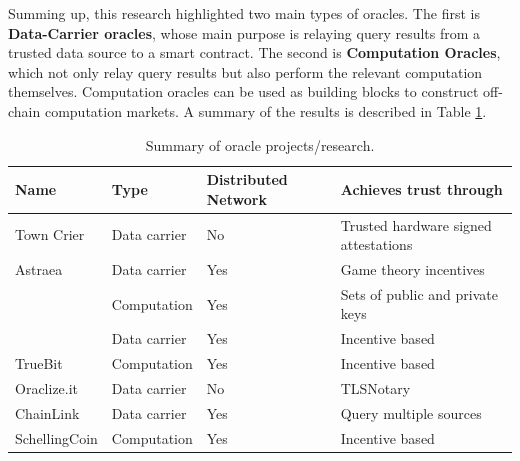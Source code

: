 Summing up, this research highlighted two main types of oracles. The first is \textbf{Data-Carrier oracles}, whose main purpose is relaying query results from a trusted data source to a smart contract. The second is \textbf{Computation Oracles}, which not only relay query results but also perform the relevant computation themselves. Computation oracles can be used as building blocks to construct off-chain computation markets. A summary of the results is described in Table \ref{oracle-summary}.



\begin{table}[]
  \centering
  \begin{tabular}{llll}
    \hline
    Name                                      & Type         & Distributed Network & Achieves trust through               \\ \hline
    Town Crier                                & Data carrier & No                  & Trusted hardware signed attestations \\
    Astraea                                   & Data carrier & Yes                 & Game theory incentives               \\
    \cite{Gordon2017ProvenanceSensorsb}       & Computation  & Yes                 & Sets of public and private keys      \\
    \cite{MontotoMonroy2018BitcoinBlockchain} & Data carrier & Yes                 & Incentive based                      \\
    TrueBit                                   & Computation  & Yes                 & Incentive based                      \\
    Oraclize.it                               & Data carrier & No                  & TLSNotary                            \\
    ChainLink                                 & Data carrier & Yes                 & Query multiple sources               \\
    SchellingCoin                             & Computation  & Yes                 & Incentive based                      \\ \hline
  \end{tabular}
  \caption{Summary of oracle projects/research.}
  \label{oracle-summary}
\end{table}

